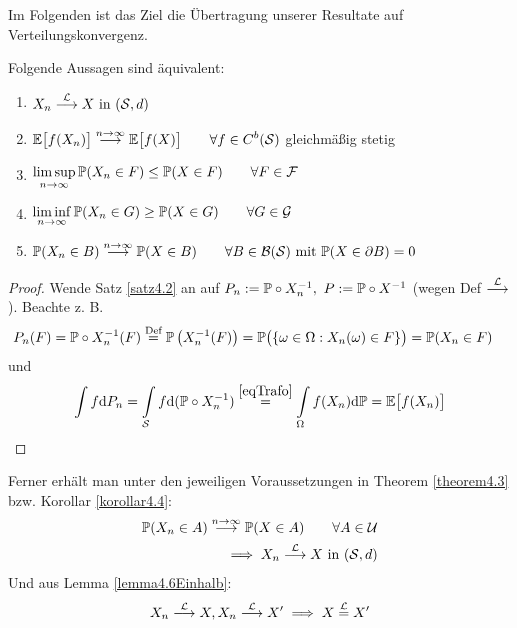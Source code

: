 Im Folgenden ist das Ziel die Übertragung unserer Resultate auf Verteilungskonvergenz.

\begin{satz}\label{satz4.7}\enter
	Folgende Aussagen sind äquivalent:
	\begin{enumerate}[label=(\arabic*)]
		\item $\begin{aligned}
			X_n\stackrel{\L}{\longrightarrow} X\text{ in }(\S,d)
		\end{aligned}$
		\item $\begin{aligned}
			\E\big[f(X_n)\big]\stackrel{n\to\infty}{\longrightarrow}\E\big[f(X)\big]\qquad\forall f\in C^b(\S)
		\end{aligned}$ gleichmäßig stetig
		\item $\begin{aligned}
			\limsup\limits_{n\to\infty}\P(X_n\in F)\leq\P(X\in F)\qquad\forall F\in\F
		\end{aligned}$
		\item $\begin{aligned}
			\liminf\limits_{n\to\infty}\P(X_n\in G)\geq\P(X\in G)\qquad\forall G\in\G
		\end{aligned}$
		\item $\begin{aligned}
			\P(X_n\in B)\stackrel{n\to\infty}{\longrightarrow}\P(X\in B)\qquad\forall B\in\B(\S)\mit\P(X\in\partial B)=0
		\end{aligned}$
	\end{enumerate}
\end{satz}

\begin{proof}
	Wende Satz \ref{satz4.2} an auf $P_n:=\P\circ X^{-1}_n,~P:=\P\circ X^{-1}$ (wegen Def $\stackrel{\L}{\longrightarrow}$). 
	Beachte z. B.
	\begin{align*}
		P_n(F)&=\P\circ X^{-1}_n(F)
		\stackeq{\text{Def}}
		\P\left(X_n^{-1}(F)\right)
		=\P\big(\lbrace\omega\in\Omega:X_n(\omega)\in F\rbrace\big)
		=\P(X_n\in F)
	\end{align*}
	und 
	\begin{align*}
		\int\limits f\d P_n
		=
		\int\limits_{\S} f\d(\P\circ X_n^{-1})
		\stackeq{\eqref{eqTrafo}}
		\int\limits_\Omega f(X_n)\d\P
		=\E\big[f(X_n)\big]
	\end{align*}
\end{proof}

Ferner erhält man unter den jeweiligen Voraussetzungen in Theorem \ref{theorem4.3} bzw. Korollar \ref{korollar4.4}:
\begin{align*}
	\P(X_n\in A)\stackrel{n\to\infty}{\longrightarrow}\P(X\in A)\qquad\forall A\in\U\\
	\implies X_n\stackrel{\L}{\longrightarrow} X\text{ in }(\S,d)
\end{align*}
Und aus Lemma \ref{lemma4.6Einhalb}:
\begin{align*}
	X_n\stackrel{\L}{\longrightarrow} X,X_n\stackrel{\L}{\longrightarrow} X'\implies X\stackeq{\L}X'
\end{align*}


